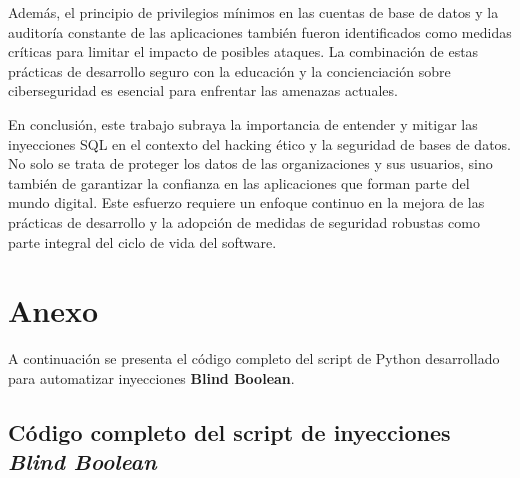 \documentclass[a4paper,12pt]{article}
\begin{document}
\vspace{0,5cm}



Además, el principio de privilegios mínimos en las cuentas de base de datos y la auditoría constante de las aplicaciones también fueron identificados como medidas críticas para limitar el impacto de posibles ataques. La combinación de estas prácticas de desarrollo seguro con la educación y la concienciación sobre ciberseguridad es esencial para enfrentar las amenazas actuales.

\vspace{0,5cm}

En conclusión, este trabajo subraya la importancia de entender y mitigar las inyecciones SQL en el contexto del hacking ético y la seguridad de bases de datos. No solo se trata de proteger los datos de las organizaciones y sus usuarios, sino también de garantizar la confianza en las aplicaciones que forman parte del mundo digital. Este esfuerzo requiere un enfoque continuo en la mejora de las prácticas de desarrollo y la adopción de medidas de seguridad robustas como parte integral del ciclo de vida del software.



\section{Anexo}
\label{sec:anexo}
A continuación se presenta el código completo del script de Python desarrollado para automatizar inyecciones \textbf{Blind Boolean}.

\subsection{Código completo del script de inyecciones \textit{Blind Boolean}}
\end{document}
